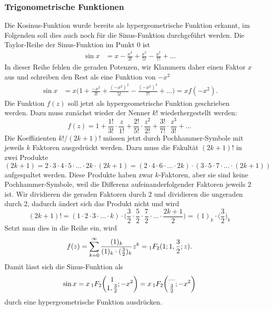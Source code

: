 \subsubsection{Trigonometrische Funktionen}
Die Kosinus-Funktion wurde bereits als hypergeometrische Funktion erkannt,
im Folgenden soll dies auch noch für die Sinus-Funktion
durchgeführt werden.
Die Taylor-Reihe der Sinus-Funktion im Punkt $0$ ist
\begin{align*}
\sin x
&=
x-\frac{x^3}{3!}+\frac{x^5}{5!}-\frac{x^7}{7!}+\dots
\end{align*}
In dieser Reihe fehlen die geraden Potenzen, wir Klammern daher einen
Faktor $x$ aus und schreiben den Rest als eine Funktion von $-x^2$
\begin{align*}
\sin x
&=
x
\biggl(
1+\frac{-x^2}{3!}+\frac{(-x^2)^2}{5!}-\frac{(-x^2)^3}{7!}+\dots
\biggr)
=
x f(-x^2).
\end{align*}
Die Funktion $f(z)$ soll jetzt als hypergeometrische Funktion geschrieben
werden.
Dazu muss zunächst wieder der Nenner $k!$ wiederhergestellt werden:
\[
f(z)
=
1
+
\frac{1!}{3!}\cdot \frac{z}{1!}
+
\frac{2!}{5!}\cdot \frac{z^2}{2!}
+
\frac{3!}{7!}\cdot \frac{z^3}{3!}
+
\dots
\]
Die Koeffizienten $k!/(2k+1)!$ müssen jetzt durch Pochhammer-Symbole
mit jeweils $k$ Faktoren ausgedrückt werden.
Dazu muss die Fakultät $(2k+1)!$ in zwei Produkte
\[
(2k+1)
=
2\cdot 3 \cdot 4\cdot 5\cdot \ldots \cdot 2k \cdot (2k+1)
=
(2\cdot 4 \cdot 6\cdot\ldots\cdot 2k)
\cdot
(3\cdot 5\cdot 7\cdot \ldots \cdot (2k+1))
\]
aufgespaltet werden.
Diese Produkte haben zwar $k$-Faktoren, aber sie sind keine
Pochhammer-Symbole, weil die Differenz aufeinanderfolgender Faktoren 
jeweils $2$ ist.
Wir dividieren die geraden Faktoren durch $2$ und dividieren die 
ungeraden durch $2$, dadurch ändert sich das Produkt nicht und wird
\[
(2k+1)!
=
(1\cdot2\cdot3\cdot\ldots\cdot k)
\cdot
\biggl(
\frac{3}{2}\cdot
\frac{5}{2}\cdot
\frac{7}{2}\cdot
\ldots\cdot
\frac{2k+1}{2}
\biggr)
=
(1)_k\cdot \biggl(\frac{3}{2}\biggr)_k
\]
Setzt man dies in die Reihe ein, wird
\[
f(z)
=
\sum_{k=0}^\infty
\frac{(1)_k}{(1)_k\cdot (\frac{3}{2})_k}
z^k
=
\mathstrut_1F_2(1;1,\frac{3}{2};z).
\]
Damit lässt sich die Sinus-Funktion als
\begin{equation}
\sin x
=
x\,\mathstrut_1F_2\biggl(\begin{matrix}1\\1,\frac32\end{matrix};-x^2\biggr)
=
x\,\mathstrut_1F_2\biggl(\begin{matrix}\text{---}\\\frac32\end{matrix};-x^2\biggr)
\label{buch:rekursion:hypergeometrisch:eqn:sinhyper}
\end{equation}
durch eine hypergeometrische Funktion ausdrücken.

